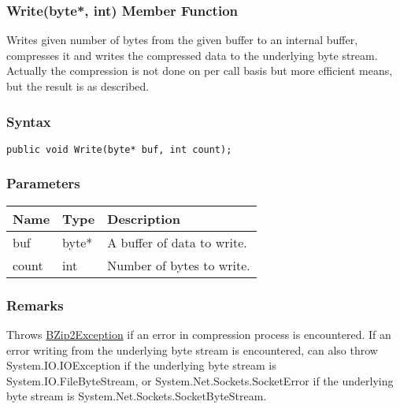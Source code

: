 \documentclass[a4paper,oneside,11.000000pt]{book}
\begin{document}
\hypertarget{System.IO.Compression.DeflateStream.Write.P.System.IO.Compression.DeflateStream.P.byte.int}{\subsubsection*{Write(byte*, int) Member Function}}
\begin{flushleft}
Writes given number of bytes from the given buffer to an internal buffer,
compresses it and writes the compressed data to the underlying byte stream.
Actually the compression is not done on per call basis but more efficient means, but
the result is as described.

\end{flushleft}
\subsubsection*{Syntax}\texttt{public void Write(byte* buf, int count);}

\subsubsection*{Parameters}
\begin{flushleft}
\begin{supertabular}[l]{lll}
\textbf{Name}
& \textbf{Type}
& \textbf{Description}
\\
\hline
buf
& byte*
& A buffer of data to write.

\\
count
& int
& Number of bytes to write.

\\
\end{supertabular}

\end{flushleft}
\subsubsection*{Remarks}
\begin{flushleft}
Throws \hyperlink{System.IO.Compression.BZip2Exception}{BZip2Exception} if an error in compression process is encountered.
If an error writing from the underlying byte stream is encountered,
can also throw System.\-IO.\-IOException if the underlying byte stream is System.\-IO.\-FileByteStream, or
System.\-Net.\-Sockets.\-SocketError if the underlying byte stream is System.\-Net.\-Sockets.\-SocketByteStream.

\end{flushleft}
\clearpage
\end{document}
